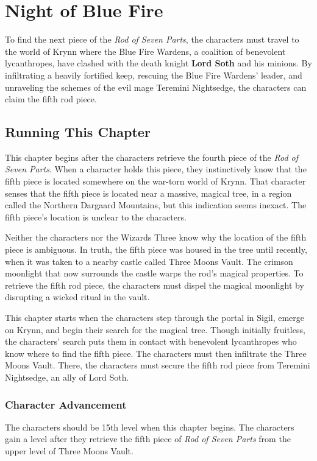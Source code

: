 \documentclass[10pt,a4paper,twoside,bg=print,twocolumn,openany,nodeprecatedcode]{dndbook}
\begin{document}
\chapter{Night of Blue Fire}
To find the next piece of the \textit{Rod of Seven Parts}, the characters must travel to the world of Krynn where the Blue Fire Wardens, a coalition of benevolent lycanthropes, have clashed with the death knight \textbf{Lord Soth} and his minions. By infiltrating a heavily fortified keep, rescuing the Blue Fire Wardens' leader, and unraveling the schemes of the evil mage Teremini Nightsedge, the characters can claim the fifth rod piece.

\section{Running This Chapter}
This chapter begins after the characters retrieve the fourth piece of the \textit{Rod of Seven Parts}. When a character holds this piece, they instinctively know that the fifth piece is located somewhere on the war-torn world of Krynn. That character senses that the fifth piece is located near a massive, magical tree, in a region called the Northern Dargaard Mountains, but this indication seems inexact. The fifth piece's location is unclear to the characters.

Neither the characters nor the Wizards Three know why the location of the fifth piece is ambiguous. In truth, the fifth piece was housed in the tree until recently, when it was taken to a nearby castle called Three Moons Vault. The crimson moonlight that now surrounds the castle warps the rod's magical properties. To retrieve the fifth rod piece, the characters must dispel the magical moonlight by disrupting a wicked ritual in the vault.

This chapter starts when the characters step through the portal in Sigil, emerge on Krynn, and begin their search for the magical tree. Though initially fruitless, the characters' search puts them in contact with benevolent lycanthropes who know where to find the fifth piece. The characters must then infiltrate the Three Moons Vault. There, the characters must secure the fifth rod piece from Teremini Nightsedge, an ally of Lord Soth.

\subsection{Character Advancement}
The characters should be 15th level when this chapter begins. The characters gain a level after they retrieve the fifth piece of \textit{Rod of Seven Parts} from the upper level of Three Moons Vault.
\end{document}
